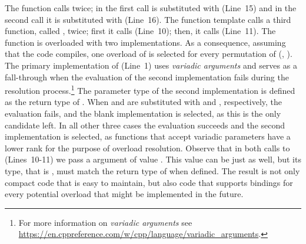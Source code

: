 The function  calls  twice; in the first call  is substituted with  (Line~15) and in the second call  it is substituted with  (Line~16).  The function template  calls a third function, called , twice; first it calls  (Line~10); then, it calls  (Line~11). The function  is overloaded with two implementations. As a consequence, assuming that the code compiles, one overload of  is selected for every permutation of (, ). The primary implementation of  (Line~1) uses \emph{variadic arguments} and serves as a fall-through when the evaluation of the second implementation fails during the resolution process.\footnote{For more information on \emph{variadic arguments} see \url{https://en.cppreference.com/w/cpp/language/variadic_arguments}.} The parameter type of the second implementation is defined as the return type of . When  and  are substituted with  and , respectively, the evaluation fails, and the blank implementation is selected, as this is the only candidate left. In all other three cases the evaluation succeeds and the second implementation is selected, as functions that accept variadic parameters have a lower rank for the purpose of overload resolution.
Observe that in both calls to  (Lines~10-11) we pass a  argument of value . This value can be  just as well, but its type, that is , must match the return type of  when defined. The result is not only compact code that is easy to maintain, but also code that supports bindings for every potential  overload that might be implemented in the future.

